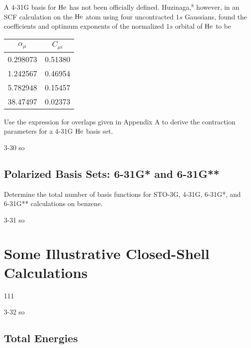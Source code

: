 \documentclass[a4paper]{book}
\begin{document}
	\begin{exercise}
	A 4-31G basis for $\ce{He}$ has not been officially defined. Huzinaga,${}^8$ however, in an SCF calculation on the $\ce{He}$ atom using four uncontracted $1s$ Gaussians, found the coefficients and optimum exponents of the normalized $1s$ orbital of $\ce{He}$ to be
	\begin{center}
	\begin{tabular}{cc} \hline
		$\alpha_\mu$ 	& $C_{\mu i}$ 	\\ \hline
		0.298073		& 0.51380		\\
		1.242567		& 0.46954 		\\
		5.782948		& 0.15457		\\
		38.47497		& 0.02373		\\ \hline
	\end{tabular}
	\end{center}
	Use the expression for overlaps given in Appendix A to derive the contraction parameters for a 4-31G $\ce{He}$ basis set.
	\end{exercise}
	
	\begin{solution}
		3-30 so
	\end{solution}
	
	\subsection{Polarized Basis Sets: 6-31G* and 6-31G**}
	
	\begin{exercise}
	Determine the total number of basis functions for STO-3G, 4-31G, 6-31G*, and 6-31G** calculations on benzene.
	\end{exercise}
	
	\begin{solution}
		3-31 so
	\end{solution}
	
	\section{Some Illustrative Closed-Shell Calculations}
	
	\begin{exercise}
	111
	\end{exercise}
	
	\begin{solution}
		3-32 so
	\end{solution}
	
	\subsection{Total Energies}
	
\end{document}

